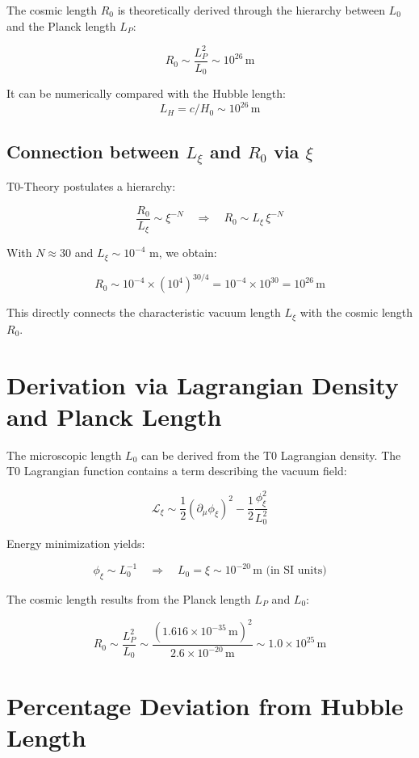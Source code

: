 \documentclass[12pt,a4paper]{article}
\numberwithin{equation}{section}
\begin{document}
	The cosmic length $R_0$ is theoretically derived through the hierarchy between $L_0$ and the Planck length $L_P$:
	
	\[
	R_0 \sim \frac{L_P^2}{L_0} \sim 10^{26}\,\text{m}
	\]
	
	It can be numerically compared with the Hubble length:
	\[
	L_H = c / H_0 \sim 10^{26}\,\text{m}
	\]
	
	\subsection{Connection between $L_\xi$ and $R_0$ via $\xi$}
	
	T0-Theory postulates a hierarchy:
	
	\[
	\frac{R_0}{L_\xi} \sim \xi^{-N} \quad \Rightarrow \quad R_0 \sim L_\xi \, \xi^{-N}
	\]
	
	With $N \approx 30$ and $L_\xi \sim 10^{-4}$ m, we obtain:
	
	\[
	R_0 \sim 10^{-4} \times (10^4)^{30/4} = 10^{-4} \times 10^{30} = 10^{26}\,\text{m}
	\]
	
	This directly connects the characteristic vacuum length $L_\xi$ with the cosmic length $R_0$.
	
	\section{Derivation via Lagrangian Density and Planck Length}
	
	The microscopic length $L_0$ can be derived from the T0 Lagrangian density. The T0 Lagrangian function contains a term describing the vacuum field:
	
	\[
	\mathcal{L}_{\xi} \sim \frac{1}{2} (\partial_\mu \phi_\xi)^2 - \frac{1}{2} \frac{\phi_\xi^2}{L_0^2}
	\]
	
	Energy minimization yields:
	
	\[
	\phi_\xi \sim L_0^{-1} \quad \Rightarrow \quad L_0 = \xi \sim 10^{-20}\,\text{m (in SI units)}
	\]
	
	The cosmic length results from the Planck length $L_P$ and $L_0$:
	
	\[
	R_0 \sim \frac{L_P^2}{L_0} \sim \frac{(1.616 \times 10^{-35}\,\text{m})^2}{2.6 \times 10^{-20}\,\text{m}} \sim 1.0 \times 10^{25}\,\text{m}
	\]
	
	\section{Percentage Deviation from Hubble Length}
	
\end{document}
